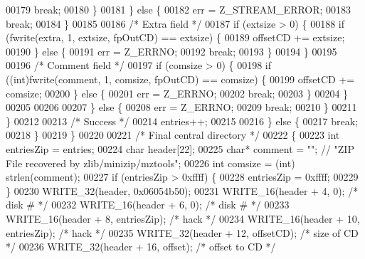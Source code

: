 \begin{DoxyCode}
00179                 \textcolor{keywordflow}{break};
00180               \}
00181             \} \textcolor{keywordflow}{else} \{
00182               err = Z\_STREAM\_ERROR;
00183               \textcolor{keywordflow}{break};
00184             \}
00185 
00186             \textcolor{comment}{/* Extra field */}
00187             \textcolor{keywordflow}{if} (extsize > 0) \{
00188               \textcolor{keywordflow}{if} (fwrite(extra, 1, extsize, fpOutCD) == extsize) \{
00189                 offsetCD += extsize;
00190               \} \textcolor{keywordflow}{else} \{
00191                 err = Z\_ERRNO;
00192                 \textcolor{keywordflow}{break};
00193               \}
00194             \}
00195 
00196             \textcolor{comment}{/* Comment field */}
00197             \textcolor{keywordflow}{if} (comsize > 0) \{
00198               \textcolor{keywordflow}{if} ((\textcolor{keywordtype}{int})fwrite(comment, 1, comsize, fpOutCD) == comsize) \{
00199                 offsetCD += comsize;
00200               \} \textcolor{keywordflow}{else} \{
00201                 err = Z\_ERRNO;
00202                 \textcolor{keywordflow}{break};
00203               \}
00204             \}
00205 
00206 
00207           \} \textcolor{keywordflow}{else} \{
00208             err = Z\_ERRNO;
00209             \textcolor{keywordflow}{break};
00210           \}
00211         \}
00212 
00213         \textcolor{comment}{/* Success */}
00214         entries++;
00215 
00216       \} \textcolor{keywordflow}{else} \{
00217         \textcolor{keywordflow}{break};
00218       \}
00219     \}
00220 
00221     \textcolor{comment}{/* Final central directory  */}
00222     \{
00223       \textcolor{keywordtype}{int} entriesZip = entries;
00224       \textcolor{keywordtype}{char} header[22];
00225       \textcolor{keywordtype}{char}* comment = \textcolor{stringliteral}{""}; \textcolor{comment}{// "ZIP File recovered by zlib/minizip/mztools";}
00226       \textcolor{keywordtype}{int} comsize = (int) strlen(comment);
00227       \textcolor{keywordflow}{if} (entriesZip > 0xffff) \{
00228         entriesZip = 0xffff;
00229       \}
00230       WRITE\_32(header, 0x06054b50);
00231       WRITE\_16(header + 4, 0);    \textcolor{comment}{/* disk # */}
00232       WRITE\_16(header + 6, 0);    \textcolor{comment}{/* disk # */}
00233       WRITE\_16(header + 8, entriesZip);   \textcolor{comment}{/* hack */}
00234       WRITE\_16(header + 10, entriesZip);  \textcolor{comment}{/* hack */}
00235       WRITE\_32(header + 12, offsetCD);    \textcolor{comment}{/* size of CD */}
00236       WRITE\_32(header + 16, offset);      \textcolor{comment}{/* offset to CD */}

\end{DoxyCode}
